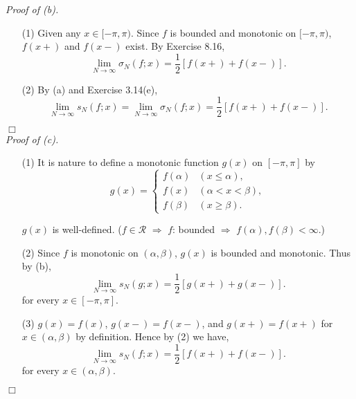 \documentclass{article}
\begin{document}
\emph{Proof of (b).}
\begin{enumerate}
\item[(1)]
  Given any $x \in [-\pi,\pi)$.
  Since $f$ is bounded and monotonic on $[-\pi,\pi)$,
  $f(x+)$ and $f(x-)$ exist.
  By Exercise 8.16,
  \[
    \lim_{N \to \infty} \sigma_N(f;x) = \frac{1}{2}[f(x+)+f(x-)].
  \]

\item[(2)]
  By (a) and Exercise 3.14(e),
  \[
    \lim_{N \to \infty} s_N(f;x)
    = \lim_{N \to \infty} \sigma_N(f;x)
    = \frac{1}{2}[f(x+)+f(x-)].
  \]
\end{enumerate}
$\Box$ \\



\emph{Proof of (c).}
\begin{enumerate}
\item[(1)]
  It is nature to define a monotonic function $g(x)$ on $[-\pi,\pi]$
  by
  \begin{equation*}
    g(x) =
      \begin{cases}
        f(\alpha) & (x \leq \alpha), \\
        f(x)      & (\alpha < x < \beta), \\
        f(\beta)  & (x \geq \beta).
      \end{cases}
  \end{equation*}

  $g(x)$ is well-defined.
  ($f \in \mathscr{R}$
  $\Longrightarrow$ $f$: bounded
  $\Longrightarrow$ $f(\alpha), f(\beta) < \infty$.)

\item[(2)]
  Since $f$ is monotonic on $(\alpha,\beta)$,
  $g(x)$ is bounded and monotonic.
  Thus by (b),
  \[
    \lim_{N \to \infty} s_N(g;x) = \frac{1}{2}[g(x+)+g(x-)].
  \]
  for every $x \in [-\pi,\pi]$.

\item[(3)]
  $g(x) = f(x)$,
  $g(x-) = f(x-)$,
  and $g(x+) = f(x+)$ for $x \in (\alpha,\beta)$ by definition.
  Hence by (2) we have,
  \[
    \lim_{N \to \infty} s_N(f;x) = \frac{1}{2}[f(x+)+f(x-)].
  \]
  for every $x \in (\alpha,\beta)$.
\end{enumerate}
$\Box$ \\\\



\end{document}
